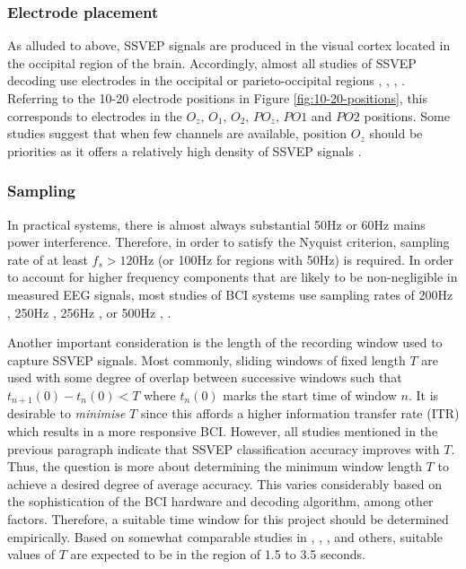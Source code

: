 \subsubsection{Electrode placement}
As alluded to above, SSVEP signals are produced in the visual cortex located in the occipital region of the brain. Accordingly, almost all studies of SSVEP decoding use electrodes in the occipital or parieto-occipital regions \cite{autthasan-single-chan-ssvep}, \cite{acampora-dataset}, \cite{chu-ssvep-colours}, \cite{chu-ssvep-colours}. Referring to the 10-20 electrode positions in Figure \ref{fig:10-20-positions}, this corresponds to electrodes in the $O_z, \, O_1,\, O_2,\, PO_z,\, PO1$ and $PO2$ positions. Some studies suggest that when few channels are available, position $O_z$ should be priorities as it offers a relatively high density of SSVEP signals \cite{autthasan-single-chan-ssvep}.

\subsubsection{Sampling}
\label{subsection:time-frequency-considerations-c2}
In practical systems, there is almost always substantial 50Hz or 60Hz mains power interference. Therefore, in order to satisfy the Nyquist criterion, sampling rate of at least $f_s > 120$Hz (or 100Hz for regions with 50Hz) is required. In order to account for higher frequency components that are likely to be non-negligible in measured EEG signals, most studies of BCI systems use sampling rates of 200Hz \cite{peterson-bci-survey}, 250Hz \cite{zhang-mset-cca}, 256Hz \cite{miao-hybrid-cca}, \cite{nakanishi-cca-comparison} or 500Hz \cite{varnavas-phd}, \cite{duart-comparing-ssvep-stimuli}.

Another important consideration is the length of the recording window used to capture SSVEP signals. Most commonly, sliding windows of fixed length $T$ are used with some degree of overlap between successive windows such that $t_{n+1}{(0)} - t_{n}{(0)} < T$ where $t_n{(0)}$ marks the start time of window $n$. It is desirable to \textit{minimise} $T$ since this affords a higher information transfer rate (ITR) which results in a more responsive BCI. However, all studies mentioned in the previous paragraph indicate that SSVEP classification accuracy improves with $T$. Thus, the question is more about determining the minimum window length $T$ to achieve a desired degree of average accuracy. This varies considerably based on the sophistication of the BCI hardware and decoding algorithm, among other factors. Therefore, a suitable time window for this project should be determined empirically. Based on somewhat comparable studies in \cite{uktveris-modular-bci}, \cite{chu-ssvep-colours}, \cite{autthasan-single-chan-ssvep}, \cite{liao-gaming-control} and others, suitable values of $T$ are expected to be in the region of 1.5 to 3.5 seconds.

